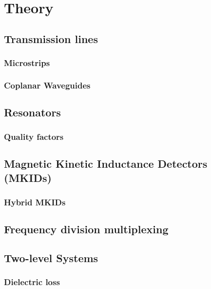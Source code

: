 %
\chapter{Theory}
\label{sec:related}


\Blindtext[2][1]

\section{Transmission lines}
\subsection{Microstrips}
\subsection{Coplanar Waveguides}
\label{sec:related:sec1}

\Blindtext[2][2]
\section{Resonators}
\subsection{Quality factors}
\section{Magnetic Kinetic Inductance Detectors (MKIDs)}
\subsection{Hybrid MKIDs}
\label{sec:related:sec2}

\Blindtext[3][2]
\section{Frequency division multiplexing}
\section{Two-level Systems}
\subsection{Dielectric loss}
